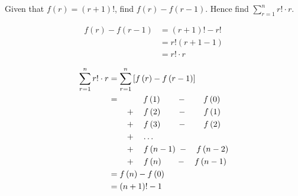 \documentclass[11pt,a4paper]{book}
\begin{document}
\newpage

\begin{example}

Given that $f\left(r\right)=\left(r+1\right)!$, find $f\left(r\right)-f\left(r-1\right)$.
Hence find ${\displaystyle \sum_{r=1}^{n}r!\cdot r}$.

\Solution

\begin{align*}
f\left(r\right)-f\left(r-1\right) & =\left(r+1\right)!-r!\\
 & =r!\left(r+1-1\right)\\
 & =r!\cdot r
\end{align*}

\begin{align*}
\sum_{r=1}^{n}r!\cdot r & =\sum_{r=1}^{n}\left[f\left(r\right)-f\left(r-1\right)\right]\\
 & =\hspace{1cm}{f\left(1\right)}\qquad-\qquad f\left(0\right)\\
 & \qquad+\quad{f\left(2\right)}\qquad-\qquad{f\left(1\right)}\\
 & \qquad+\quad{f\left(3\right)}\qquad-\qquad{f\left(2\right)}\\
 & \qquad+\quad\ldots\\
 & \qquad+\quad{f\left(n-1\right)}\hspace{0.3em}-\quad{f\left(n-2\right)}\\
 & \qquad+\quad f\left(n\right)\hspace{0.63cm}-\quad{f\left(n-1\right)}\\
 & =f\left(n\right)-f\left(0\right)\\
 & =\left(n+1\right)!-1
\end{align*}

\end{example}
\end{document}

